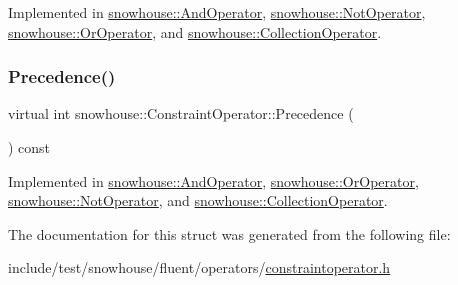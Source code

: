 Implemented in \mbox{\hyperlink{structsnowhouse_1_1AndOperator_a59f6a119b0a03df13f7bb99b8fd8ecf9}{snowhouse\+::\+And\+Operator}}, \mbox{\hyperlink{structsnowhouse_1_1NotOperator_af2dc2b844260fd317207960087bd074f}{snowhouse\+::\+Not\+Operator}}, \mbox{\hyperlink{structsnowhouse_1_1OrOperator_abd9c1f7e6b6867e83a0e7b0bbaa75f02}{snowhouse\+::\+Or\+Operator}}, and \mbox{\hyperlink{structsnowhouse_1_1CollectionOperator_a7a7d525c230d238e0d643c2135be5f1d}{snowhouse\+::\+Collection\+Operator}}.

\mbox{\label{structsnowhouse_1_1ConstraintOperator_ac7c231c1a9f183c0a2cce8544566eeff}} 
\subsubsection{\texorpdfstring{Precedence()}{Precedence()}}
{\footnotesize\ttfamily virtual int snowhouse\+::\+Constraint\+Operator\+::\+Precedence (\begin{DoxyParamCaption}{ }\end{DoxyParamCaption}) const\hspace{0.3cm}{\ttfamily [pure virtual]}}



Implemented in \mbox{\hyperlink{structsnowhouse_1_1AndOperator_a791ad296866bdf103cdb7905de1a3e0e}{snowhouse\+::\+And\+Operator}}, \mbox{\hyperlink{structsnowhouse_1_1OrOperator_af0c0077685e16330a75b0c96f29ed405}{snowhouse\+::\+Or\+Operator}}, \mbox{\hyperlink{structsnowhouse_1_1NotOperator_aa8efde1ec3fd4ff2fee91a6985b6c36c}{snowhouse\+::\+Not\+Operator}}, and \mbox{\hyperlink{structsnowhouse_1_1CollectionOperator_a07f46f3b8e9c56464624b55ba1b8189c}{snowhouse\+::\+Collection\+Operator}}.



The documentation for this struct was generated from the following file\+:\begin{DoxyCompactItemize}
\item 
include/test/snowhouse/fluent/operators/\mbox{\hyperlink{constraintoperator_8h}{constraintoperator.\+h}}\end{DoxyCompactItemize}
